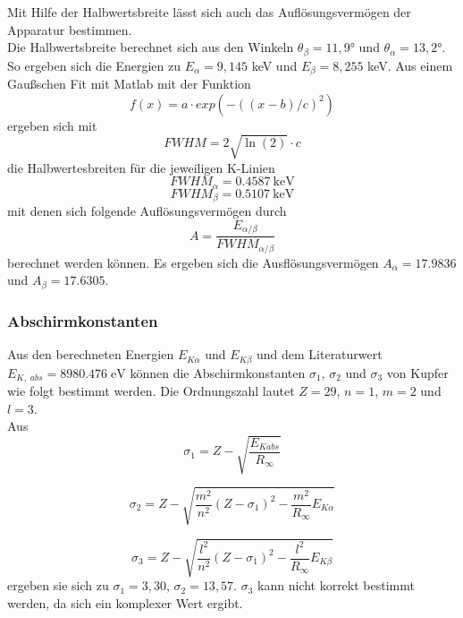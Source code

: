 Mit Hilfe der Halbwertsbreite lässt sich auch das Auflösungsvermögen der Apparatur bestimmen. \\
Die Halbwertsbreite berechnet sich aus den Winkeln $\theta_\beta = 11,9°$ und $\theta_\alpha = 13,2°$.\\
So ergeben sich die Energien zu $E_\alpha = 9,145$ keV und $E_\beta = 8,255$ keV. Aus einem Gaußschen Fit mit Matlab mit der Funktion
\begin{equation*}
  f(x)=a\cdot exp(-((x-b)/c)^2)
\end{equation*} 
ergeben sich mit
\begin{equation*}
  FWHM=2\sqrt{\ln(2)}\cdot c
\end{equation*} 
die Halbwertesbreiten für die jeweiligen K-Linien
\begin{equation*}
  FWHM_{\alpha}=0.4587\ \si{\keV}
\end{equation*}
\begin{equation*}
  FWHM_{\beta}=0.5107\ \si{\keV}
\end{equation*} 
mit denen sich folgende Auflösungsvermögen durch
\begin{equation*}
  A=\frac{E_{\alpha/\beta}}{FWHM_{\alpha/\beta}}
\end{equation*}
berechnet werden können.
Es ergeben sich die Ausflösungsvermögen $A_\alpha=17.9836$ und $A_\beta=17.6305$.\\


\subsubsection*{Abschirmkonstanten}

Aus den berechneten Energien $E_{K \alpha}$ und $E_{K \beta}$ und dem Literaturwert $E_{K,\;abs} = 8980.476 \; \mathrm{eV}$ können die 
Abschirmkonstanten $\sigma_1$, $\sigma_2$ und $\sigma_3$ von Kupfer wie folgt bestimmt werden. Die Ordnungszahl lautet $Z = 29$, $n=1$, $m=2$ und $l=3$. \\
Aus 
\begin{equation*}
  \sigma_1=Z-\sqrt{\frac{E_{Kabs}}{R_\infty}}
  \label{eq:sigma}
\end{equation*}
  
\begin{equation*}
  \sigma_2=Z-\sqrt{ \frac{m^2}{n^2}(Z-\sigma_1)^2 - \frac{m^2}{R_\infty} E_{K\alpha}}
\end{equation*}
  
\begin{equation*}
      \sigma_3=Z-\sqrt{ \frac{l^2}{n^2}(Z-\sigma_1)^2 - \frac{l^2}{R_\infty} E_{K\beta}}
\end{equation*}
ergeben sie sich zu $\sigma_1 = 3,30$, $\sigma_2 = 13,57$. 
$\sigma_3$ kann nicht korrekt bestimmt werden, da sich ein komplexer Wert ergibt.





